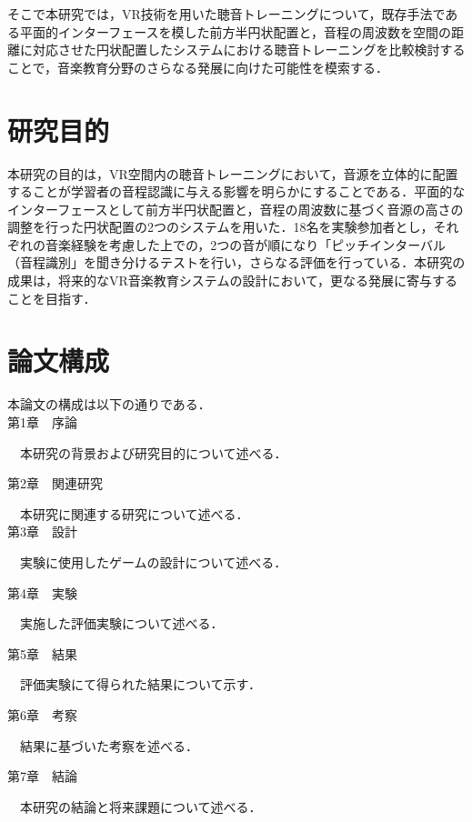 そこで本研究では，VR技術を用いた聴音トレーニングについて，既存手法\cite{pedersen2020spatialized, fletcher2019virtual}である平面的インターフェースを模した前方半円状配置と，音程の周波数を空間の距離に対応させた円状配置したシステムにおける聴音トレーニングを比較検討することで，音楽教育分野のさらなる発展に向けた可能性を模索する．

\section{研究目的}
本研究の目的は，VR空間内の聴音トレーニングにおいて，音源を立体的に配置することが学習者の音程認識に与える影響を明らかにすることである．平面的なインターフェースとして前方半円状配置と，音程の周波数に基づく音源の高さの調整を行った円状配置の2つのシステムを用いた．18名を実験参加者とし，それぞれの音楽経験を考慮した上での，2つの音が順になり「ピッチインターバル（音程識別」を聞き分けるテストを行い，さらなる評価を行っている．本研究の成果は，将来的なVR音楽教育システムの設計において，更なる発展に寄与することを目指す．

\section{論文構成}
本論文の構成は以下の通りである．\\

第1章　序論

　本研究の背景および研究目的について述べる．

第2章　関連研究

　本研究に関連する研究について述べる．\\

第3章　設計

　実験に使用したゲームの設計について述べる．

第4章　実験

　実施した評価実験について述べる．

第5章　結果

　評価実験にて得られた結果について示す．

第6章　考察

　結果に基づいた考察を述べる．

第7章　結論

　本研究の結論と将来課題について述べる．